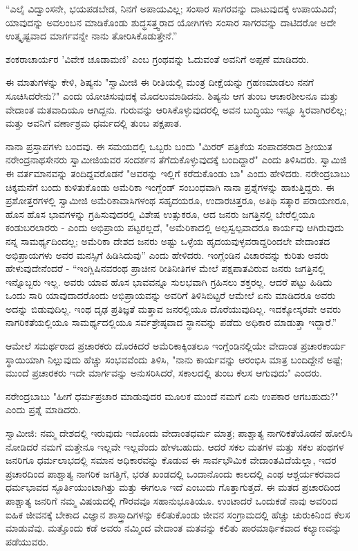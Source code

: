“ಎಲೈ ವಿದ್ವಾಂಸನೇ, ಭಯಪಡಬೇಡ, ನಿನಗೆ ಅಪಾಯವಿಲ್ಲ; ಸಂಸಾರ ಸಾಗರವನ್ನು ದಾಟುವುದಕ್ಕೆ ಉಪಾಯವಿದೆ; ಯಾವುದನ್ನು ಅವಲಂಬನ ಮಾಡಿಕೊಂಡು ಶುದ್ಧಸತ್ತ್ವರಾದ ಯೋಗಿಗಳು ಸಂಸಾರ ಸಾಗರವನ್ನು ದಾಟಿದರೋ ಅದೇ ಉತ್ಕೃಷ್ಟವಾದ ಮಾರ್ಗವನ್ನೇ ನಾನು ತೋರಿಸಿಕೊಡುತ್ತೇನೆ.”

ಶಂಕರಾಚಾರ್ಯರ 'ವಿವೇಕ ಚೂಡಾಮಣಿ' ಎಂಬ ಗ್ರಂಥವನ್ನು ಓದುವಂತೆ ಅವನಿಗೆ ಅಪ್ಪಣೆ ಮಾಡಿದರು.

ಈ ಮಾತುಗಳನ್ನು ಕೇಳಿ, ಶಿಷ್ಯನು "ಸ್ವಾಮೀಜಿ ಈ ರೀತಿಯಲ್ಲಿ ಮಂತ್ರ ದೀಕ್ಷೆಯನ್ನು ಗ್ರಹಣಮಾಡಲು ನನಗೆ ಸೂಚಿಸಿದರೇನು?" ಎಂದು ಯೋಚಿಸುವುದಕ್ಕೆ ಮೊದಲುಮಾಡಿದನು. ಶಿಷ್ಯನು ಆಗ ತುಂಬ ಆಚಾರಶೀಲನೂ ಮತ್ತು ವೇದಾಂತ ಮತವಾದಿಯೂ ಆಗಿದ್ದನು. ಗುರುವನ್ನು ಆರಿಸಿಕೊಳ್ಳುವುದರಲ್ಲಿ ಅವನ ಬುದ್ಧಿಯು ಇನ್ನೂ ಸ್ಥಿರವಾಗಿರಲಿಲ್ಲ; ಮತ್ತು ಅವನಿಗೆ ವರ್ಣಾಶ್ರಮ ಧರ್ಮದಲ್ಲಿ ತುಂಬ ಪಕ್ಷಪಾತ.

ನಾನಾ ಪ್ರಸ್ತಾಪಗಳು ಬಂದವು. ಈ ಸಮಯದಲ್ಲಿ ಒಬ್ಬರು ಬಂದು "ಮಿರರ್ ಪತ್ರಿಕೆಯ ಸಂಪಾದಕರಾದ ಶ‍್ರೀಯುತ ನರೇಂದ್ರನಾಥಸೇನರು ಸ್ವಾಮೀಜಿಯವರ ಸಂದರ್ಶನ ತೆಗೆದುಕೊಳ್ಳುವುದಕ್ಕೆ ಬಂದಿದ್ದಾರೆ" ಎಂದು ತಿಳಿಸಿದರು. ಸ್ವಾಮಿಜಿ ಈ ವರ್ತಮಾನವನ್ನು ತಂದಿದ್ದವರೊಡನೆ "ಅವರನ್ನು ಇಲ್ಲಿಗೆ ಕರೆದುಕೊಂಡು ಬಾ" ಎಂದು ಹೇಳಿದರು. ನರೇಂದ್ರಬಾಬು ಚಿಕ್ಕಮನೆಗೆ ಬಂದು ಕುಳಿತುಕೊಂಡು ಅಮೆರಿಕಾ ಇಂಗ್ಲೆಂಡ್ ಸಂಬಂಧವಾಗಿ ನಾನಾ ಪ್ರಶ್ನೆಗಳನ್ನು ಹಾಕುತ್ತಿದ್ದರು. ಈ ಪ್ರಶೋತ್ತರಗಳಲ್ಲಿ ಸ್ವಾಮೀಜಿ ಅಮೆರಿಕಾವಾಸಿಗಳಂಥ ಸಹೃದಯರೂ, ಉದಾರಚಿತ್ತರೂ, ಅತಿಥಿ ಸತ್ಕಾರ ಪರಾಯಣರೂ, ಹೊಸ ಹೊಸ ಭಾವಗಳನ್ನು ಗ್ರಹಿಸುವುದರಲ್ಲಿ ವಿಶೇಷ ಉತ್ಸುಕರೂ, ಆದ ಜನರು ಜಗತ್ತಿನಲ್ಲಿ ಬೇರೆಲ್ಲಿಯೂ ಕಂಡುಬರಲಾರರು - ಎಂದು ಅಭಿಪ್ರಾಯ ಪಟ್ಟರಲ್ಲದೆ, "ಅಮೆರಿಕಾದಲ್ಲಿ ಅಲ್ಪಸ್ವಲ್ಪವಾದರೂ ಕಾರ್ಯವು ಆಗಿರುವುದು ನನ್ನ ಸಾಮರ್ಥ್ಯದಿಂದಲ್ಲ; ಅಮೆರಿಕಾ ದೇಶದ ಜನರು ಅಷ್ಟು ಒಳ್ಳೆಯ ಹೃದಯವುಳ್ಳವರಾದ್ದರಿಂದಲೇ ವೇದಾಂತದ ಅಭಿಪ್ರಾಯಗಳು ಅವರ ಮನಸ್ಸಿಗೆ ಹಿಡಿಸಿದುವು'' ಎಂದು ಹೇಳಿದರು. ಇಂಗ್ಲೆಂಡಿನ ವಿಚಾರವನ್ನು ಕುರಿತು ಅವರು ಹೇಳುವುದೇನೆಂದರೆ - “ಇಂಗ್ಲಿಷಿನವರಂಥ ಪ್ರಾಚೀನ ರೀತಿನೀತಿಗಳ ಮೇಲೆ ಪಕ್ಷಪಾತವಿರುವ ಜನರು ಜಗತ್ತಿನಲ್ಲಿ ಇನ್ನೊಬ್ಬರು ಇಲ್ಲ. ಅವರು ಯಾವ ಹೊಸ ಭಾವವನ್ನೂ ಸುಲಭವಾಗಿ ಗ್ರಹಿಸಲು ಶಕ್ತರಲ್ಲ. ಆದರೆ ಪಟ್ಟು ಹಿಡಿದು ಒಂದು ಸಾರಿ ಯಾವುದಾದರೊಂದು ಅಭಿಪ್ರಾಯವನ್ನು ಅವರಿಗೆ ತಿಳಿಸಿಬಿಟ್ಟರೆ ಆಮೇಲೆ ಏನು ಮಾಡಿದರೂ ಅವರು ಅದನ್ನು ಬಿಡುವುದಿಲ್ಲ. ಇಂಥ ದೃಢ ಪ್ರತಿಜ್ಞತೆ ಮತ್ತಾವ ಜನರಲ್ಲಿಯೂ ದೊರೆಯುವುದಿಲ್ಲ. ಇದಕ್ಕೋಸ್ಕರವೇ ಅವರು ನಾಗರಿಕತೆಯಲ್ಲಿಯೂ ಸಾಮರ್ಥ್ಯದಲ್ಲಿಯೂ ಸರ್ವಶ್ರೇಷ್ಠವಾದ ಸ್ಥಾನವನ್ನು ಪಡೆದು ಅಧಿಕಾರ ಮಾಡುತ್ತಾ ಇದ್ದಾರೆ.”

ಆಮೇಲೆ ಸಮರ್ಥರಾದ ಪ್ರಚಾರಕರು ದೊರಕಿದರೆ ಅಮೆರಿಕಾಕ್ಕಿಂತಲೂ ಇಂಗ್ಲೆಂಡಿನಲ್ಲಿಯೇ ವೇದಾಂತ ಪ್ರಚಾರಕಾರ್ಯ ಸ್ಥಾಯಿಯಾಗಿ ನಿಲ್ಲುವುದು ಹೆಚ್ಚು ಸಂಭವವೆಂದು ತಿಳಿಸಿ, "ನಾನು ಕಾರ್ಯವನ್ನು ಆರಂಭಿಸಿ ಮಾತ್ರ ಬಂದಿದ್ದೇನೆ ಅಷ್ಟೆ; ಮುಂದೆ ಪ್ರಚಾರಕರು ಇದೇ ಮಾರ್ಗವನ್ನು ಅನುಸರಿಸಿದರೆ, ಸಕಾಲದಲ್ಲಿ ತುಂಬ ಕೆಲಸ ಆಗುವುದು" ಎಂದರು.

ನರೇಂದ್ರಬಾಬು "ಹೀಗೆ ಧರ್ಮಪ್ರಚಾರ ಮಾಡುವುದರ ಮೂಲಕ ಮುಂದೆ ನಮಗೆ ಏನು ಉಪಕಾರ ಆಗಬಹುದು?" ಎಂದು ಪ್ರಶ್ನೆ ಮಾಡಿದರು.

ಸ್ವಾಮೀಜಿ: ನಮ್ಮ ದೇಶದಲ್ಲಿ ಇರುವುದು ಇದೊಂದು ವೇದಾಂತಧರ್ಮ ಮಾತ್ರ; ಪಾಶ್ಚಾತ್ಯ ನಾಗರಿಕತೆಯೊಡನೆ ಹೋಲಿಸಿ ನೋಡಿದರೆ ನಮಗೆ ಮತ್ತೇನೂ ಇಲ್ಲವೇ ಇಲ್ಲವೆಂದು ಹೇಳಬಹುದು. ಆದರೆ ಸಕಲ ಮತಗಳ ಮತ್ತು ಸಕಲ ಪಂಥಗಳ ಜನರಿಗೂ ಧರ್ಮಲಾಭದಲ್ಲಿ ಸಮಾನ ಅಧಿಕಾರವನ್ನು ಕೊಡುವ ಈ ಸಾರ್ವಭೌಮಿಕ ವೇದಾಂತವಿದೆಯೆಲ್ಲಾ, ಇದರ ಪ್ರಚಾರದಿಂದ ಪಾಶ್ಚಾತ್ಯ ನಾಗರಿಕ ಜಗತ್ತಿಗೆ, ಭರತ ಖಂಡದಲ್ಲಿ ಒಂದಾನೊಂದು ಕಾಲದಲ್ಲಿ ಎಂಥ ಆಶ್ಚರ್ಯಕರವಾದ ಧರ್ಮಭಾವದ ಸ್ಫೂರ್ತಿಯುಂಟಾಗಿತ್ತು ಮತ್ತು ಈಗಲೂ ಇದೆ ಎಂಬುದು ಗೊತ್ತಾಗುತ್ತದೆ. ಈ ಮತದ ಪ್ರಚಾರದಿಂದ ಪಾಶ್ಚಾತ್ಯ ಜನರಿಗೆ ನಮ್ಮ ವಿಷಯದಲ್ಲಿ ಗೌರವವೂ ಸಹಾನುಭೂತಿಯೂ. ಉಂಟಾದರೆ ಒಂದುಕಡೆ ನಾವು ಅವರಿಂದ ಐಹಿಕ ಜೀವನಕ್ಕೆ ಬೇಕಾದ ವಿಜ್ಞಾನ ಶಾಸ್ತ್ರಾದಿಗಳನ್ನು ಕಲಿತುಕೊಂಡು ಜೀವನ ಸಂಗ್ರಾಮದಲ್ಲಿ ಹೆಚ್ಚು ಚುರುಕಿನಿಂದ ಕೆಲಸ ಮಾಡುವೆವು. ಮತ್ತೊಂದು ಕಡೆ ಅವರು ನಮ್ಮಿಂದ ವೇದಾಂತ ಮತವನ್ನು ಕಲಿತು ಪಾರಮಾರ್ಥಿಕವಾದ ಕಲ್ಯಾಣವನ್ನು ಪಡೆಯುವರು.

